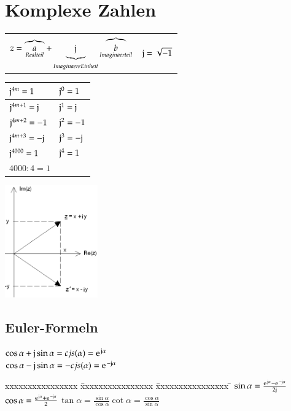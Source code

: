 \section{Komplexe Zahlen}
\begin{minipage}{10cm}
	\begin{tabular}{c c}
		$z=\overbrace{a}_{Realteil}+\underbrace{\im}_{Imaginaere Einheit} \overbrace{b}_{Imaginaerteil}$&$\im=\sqrt{-1}$\\
	\end{tabular}
	
	\begin{tabular}{|l|l|}
		\hline $\im^{4m}=1$ & $\im^{0}=1$\\
		\hline $\im^{4m+1}=\im$ & $\im^{1}=\im$\\
		\hline $\im^{4m+2}=-1$ & $\im^{2}=-1$\\
		\hline $\im^{4m+3}=-\im$ & $\im^{3}=-\im$\\
		\hline $\im^{4000}=1$& $\im^{4}=1$\\
		$4000:4=1$& \\
		\hline
	\end{tabular}
\end{minipage}
\begin{minipage}{4cm}
	\includegraphics[width=4cm]{images/komplexe_zahlen.png}
\end{minipage}

\subsection{Euler-Formeln} 
$\cos{\alpha}+\im \sin{\alpha} = cjs(\alpha)= \e^{\im \alpha}$\\
$\cos{\alpha}-\im \sin{\alpha} = -cjs(\alpha)= \e^{-\im \alpha}$

\begin{tabbing}
		xxxxxxxxxxxxxxxx \= xxxxxxxxxxxxxxxx \= xxxxxxxxxxxxxxxx \=\kill
		$\sin{\alpha}=\frac{\e^{\im\alpha}-\e^{-\im\alpha}}{2\im}$\> $\cos{\alpha}=\frac{\e^{\im\alpha}+\e^{-\im\alpha}}{2}$\>$\tan{\alpha}=\frac{\sin{\alpha}}{\cos{\alpha}}$\>$\cot{\alpha}=\frac{\cos{\alpha}}{\sin{\alpha}}$
\end{tabbing}